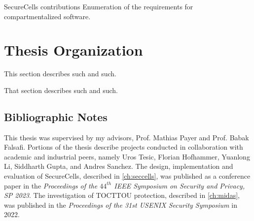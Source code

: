 SecureCells contributions
Enumeration of the requirements for compartmentalized software.

\section{Thesis Organization}

This section describes such and such.

That section describes such and such.

\subsection{Bibliographic Notes}
This thesis was supervised by my advisors, Prof. Mathias Payer and Prof. Babak Falsafi.
Portions of the thesis describe projects conducted in collaboration with academic and
industrial peers, namely Uros Tesic, Florian Hofhammer, Yuanlong Li, Siddharth Gupta, 
and Andres Sanchez.
The design, implementation and evaluation of SecureCells, described in 
\autoref{ch:seccells}, was published as a conference paper in the 
\emph{Proceedings of the $44^{th}$ IEEE Symposium on Security and Privacy, SP 2023}.
The investigation of TOCTTOU protection, described in \autoref{ch:midas},
was published in the
\emph{Proceedings of the 31st USENIX Security Symposium} in 2022.

